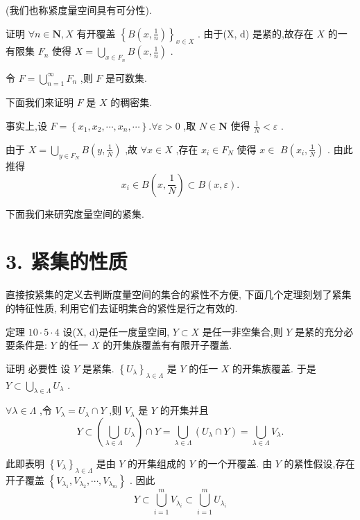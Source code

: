 (我们也称紧度量空间具有可分性).

证明 $\forall n \in  \mathbf{N},X$ 有开覆盖 ${\left\{  B\left( x,\frac{1}{n}\right) \right\}  }_{x \in  X}$ . 由于(X, d) 是紧的,故存在 $X$ 的一有限集 ${F}_{n}$ 使得 $X = \mathop{\bigcup }\limits_{{x \in  {F}_{n}}}B\left( {x,\frac{1}{n}}\right)$ .

令 $F = \mathop{\bigcup }\limits_{{n = 1}}^{\infty }{F}_{n}$ ,则 $F$ 是可数集.

下面我们来证明 $F$ 是 $X$ 的稠密集.

事实上,设 $F = \left\{  {{x}_{1},{x}_{2},\cdots ,{x}_{n},\cdots }\right\}  .\forall \varepsilon  > 0$ ,取 $N \in  \mathbf{N}$ 使得 $\frac{1}{N} < \varepsilon$ .

由于 $X = \mathop{\bigcup }\limits_{{y \in  {F}_{N}}}B\left( {y,\frac{1}{N}}\right)$ ,故 $\forall x \in  X$ ,存在 ${x}_{i} \in  {F}_{N}$ 使得 $x \in$  $B\left( {{x}_{i},\frac{1}{N}}\right)$ . 由此推得
$${x}_{i} \in  B\left( {x,\frac{1}{N}}\right)  \subset  B\left( {x,\varepsilon }\right) .$$

下面我们来研究度量空间的紧集.

\section*{3. 紧集的性质}

直接按紧集的定义去判断度量空间的集合的紧性不方便, 下面几个定理刻划了紧集的特征性质, 利用它们去证明集合的紧性是行之有效的.

定理 ${10} \cdot  5 \cdot  4$ 设(X, d)是任一度量空间, $Y \subset  X$ 是任一非空集合,则 $Y$ 是紧的充分必要条件是: $Y$ 的任一 $X$ 的开集族覆盖有有限开子覆盖.

证明 必要性 设 $Y$ 是紧集. ${\left\{  {U}_{\lambda }\right\}  }_{\lambda  \in  \Lambda }$ 是 $Y$ 的任一 $X$ 的开集族覆盖. 于是 $Y \subset  \mathop{\bigcup }\limits_{{\lambda  \in  \Lambda }}{U}_{\lambda }$ .

$\forall \lambda  \in  \Lambda$ ,令 ${V}_{\lambda } = {U}_{\lambda } \cap  Y$ ,则 ${V}_{\lambda }$ 是 $Y$ 的开集并且
$$Y \subset  \left( {\mathop{\bigcup }\limits_{{\lambda  \in  \Lambda }}{U}_{\lambda }}\right)  \cap  Y = \mathop{\bigcup }\limits_{{\lambda  \in  \Lambda }}\left( {{U}_{\lambda } \cap  Y}\right)  = \mathop{\bigcup }\limits_{{\lambda  \in  \Lambda }}{V}_{\lambda }.$$

此即表明 ${\left\{  {V}_{\lambda }\right\}  }_{\lambda  \in  \Lambda }$ 是由 $Y$ 的开集组成的 $Y$ 的一个开覆盖. 由 $Y$ 的紧性假设,存在开子覆盖 $\left\{  {{V}_{{\lambda }_{1}},{V}_{{\lambda }_{2}},\cdots ,{V}_{{\lambda }_{m}}}\right\}$ . 因此
$$Y \subset  \mathop{\bigcup }\limits_{{i = 1}}^{m}{V}_{{\lambda }_{i}} \subset  \mathop{\bigcup }\limits_{{i = 1}}^{m}{U}_{{\lambda }_{i}}$$

